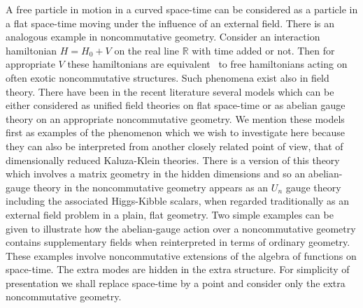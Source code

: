 \documentclass[a4paper,12pt]{article}
\def\b#1{{\mathbb #1}}
\begin{document}
A free particle in motion in a curved space-time can be considered as
a particle in a flat space-time moving under the influence of an
external field. There is an analogous example in noncommutative
geometry.  Consider an interaction hamiltonian $H = H_0 + V$ on the
real line $\b{R}$ with time added or not. Then for appropriate $V$
these hamiltonians are equivalent~\cite{SchWes92,Wes99} to free
hamiltonians acting on often exotic noncommutative structures. Such
phenomena exist also in field theory.  There have been in the recent
literature several models which can be either considered as unified
field theories on flat space-time or as abelian gauge theory on an
appropriate noncommutative geometry.  We mention these models first as
examples of the phenomenon which we wish to investigate here because
they can also be interpreted from another closely related point of
view, that of dimensionally reduced Kaluza-Klein theories. There is a
version of this theory which involves a matrix geometry in the hidden
dimensions and so an abelian-gauge theory in the noncommutative
geometry appears as an $U_n$ gauge theory including the associated
Higgs-Kibble scalars, when regarded traditionally as an external field
problem in a plain, flat geometry. Two simple examples can be given to
illustrate how the abelian-gauge action over a noncommutative geometry
contains supplementary fields when reinterpreted in terms of ordinary
geometry.  These examples involve noncommutative extensions of the
algebra of functions on space-time.  The extra modes are hidden in the
extra structure. For simplicity of presentation we shall replace
space-time by a point and consider only the extra noncommutative
geometry.
\end{document}
